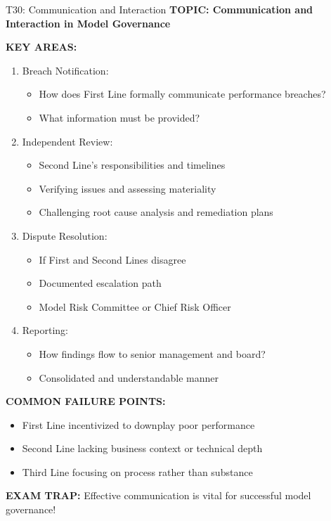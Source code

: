 \documentclass[8pt]{beamer}
\begin{document}
	\begin{frame}{T30: Communication and Interaction}
		\fontsize{6.5}{7.5}\selectfont
		\textbf{TOPIC: Communication and Interaction in Model Governance}
		
		\vspace{0.1cm}
		\textbf{KEY AREAS:}
		\begin{enumerate}
			\item \textcolor{myblue}{Breach Notification:}
			\begin{itemize}
				\item How does First Line formally communicate performance breaches?
				\item What information must be provided?
			\end{itemize}
			\item \textcolor{myblue}{Independent Review:}
			\begin{itemize}
				\item Second Line's responsibilities and timelines
				\item Verifying issues and assessing materiality
				\item Challenging root cause analysis and remediation plans
			\end{itemize}
			\item \textcolor{myblue}{Dispute Resolution:}
			\begin{itemize}
				\item If First and Second Lines disagree
				\item Documented escalation path
				\item Model Risk Committee or Chief Risk Officer
			\end{itemize}
			\item \textcolor{myblue}{Reporting:}
			\begin{itemize}
				\item How findings flow to senior management and board?
				\item Consolidated and understandable manner
			\end{itemize}
		\end{enumerate}
		
		\vspace{0.1cm}
		\textbf{COMMON FAILURE POINTS:}
		\begin{itemize}
			\item First Line incentivized to downplay poor performance
			\item Second Line lacking business context or technical depth
			\item Third Line focusing on process rather than substance
		\end{itemize}
		
		\textcolor{myred}{\textbf{EXAM TRAP:}} Effective communication is \textcolor{myblue}{vital for successful model governance}!
	\end{frame}
	
\end{document}
